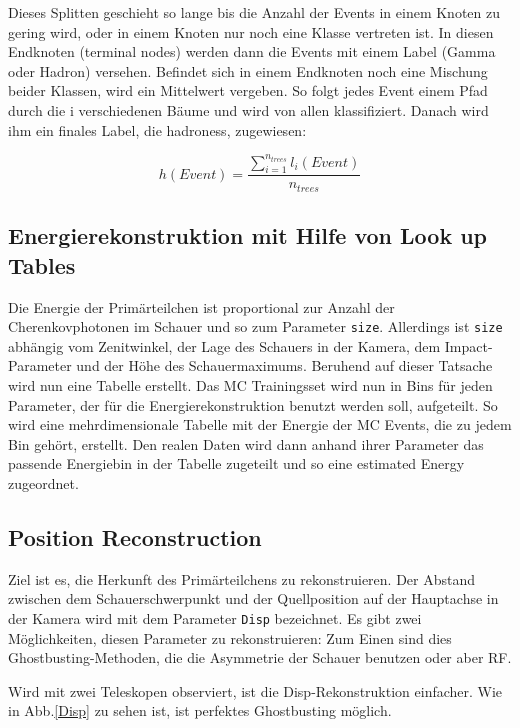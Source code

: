 Dieses Splitten geschieht so lange bis die Anzahl der Events in einem Knoten zu gering wird, oder in einem Knoten nur noch eine Klasse vertreten ist.
In diesen Endknoten (terminal nodes) werden dann die Events mit einem Label (Gamma oder Hadron) versehen. 
Befindet sich in einem Endknoten noch eine Mischung beider Klassen, wird ein Mittelwert vergeben.
So folgt jedes Event einem Pfad durch die i verschiedenen Bäume und wird von allen klassifiziert.
Danach wird ihm ein finales Label, die hadroness, zugewiesen:

\begin{equation}
 h(Event)=\frac{ \sum_{i=1} ^{n_{trees}} l_i(Event)}{n_{trees}}
\end{equation}



\subsection{Energierekonstruktion mit Hilfe von Look up Tables}
Die Energie der Primärteilchen ist proportional zur Anzahl der Cherenkovphotonen im Schauer und so zum Parameter \texttt{size}.
Allerdings ist \texttt{size} abhängig vom Zenitwinkel, der Lage des Schauers in der Kamera, dem Impact-Parameter und der Höhe des Schauermaximums.
Beruhend auf dieser Tatsache wird nun eine Tabelle erstellt.
Das MC Trainingsset wird nun in Bins für jeden Parameter, der für die Energierekonstruktion benutzt werden soll, aufgeteilt.
So wird eine mehrdimensionale Tabelle mit der Energie der MC Events, die zu jedem Bin gehört, erstellt.
Den realen Daten wird dann anhand ihrer Parameter das passende Energiebin in der Tabelle zugeteilt und so eine estimated Energy zugeordnet.


\subsection{Position Reconstruction}
Ziel ist es, die Herkunft des Primärteilchens zu rekonstruieren. 
Der Abstand zwischen dem Schauerschwerpunkt und der Quellposition auf der Hauptachse in der Kamera wird mit dem Parameter \texttt{Disp} bezeichnet.
Es gibt zwei Möglichkeiten, diesen Parameter zu rekonstruieren: Zum Einen sind dies Ghostbusting-Methoden, die die Asymmetrie der Schauer benutzen oder aber RF.

Wird mit zwei Teleskopen observiert, ist die Disp-Rekonstruktion einfacher.
Wie in Abb.\ref{Disp} zu sehen ist, ist perfektes Ghostbusting möglich.

